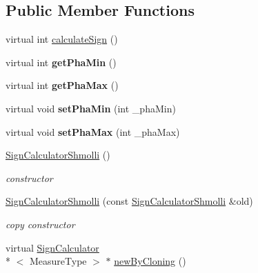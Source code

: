 \subsection*{Public Member Functions}
\begin{DoxyCompactItemize}
\item 
virtual int \hyperlink{class_ox_1_1_sign_calculator_shmolli_ab981a3a9790976de560609860f455edd}{calculate\-Sign} ()
\item 
\hypertarget{class_ox_1_1_sign_calculator_shmolli_af1182129716f5b952023280e61838a52}{virtual int {\bfseries get\-Pha\-Min} ()}\label{class_ox_1_1_sign_calculator_shmolli_af1182129716f5b952023280e61838a52}

\item 
\hypertarget{class_ox_1_1_sign_calculator_shmolli_afa6d41a49c0a321100164ae203904496}{virtual int {\bfseries get\-Pha\-Max} ()}\label{class_ox_1_1_sign_calculator_shmolli_afa6d41a49c0a321100164ae203904496}

\item 
\hypertarget{class_ox_1_1_sign_calculator_shmolli_aacfc207842127c87086f5595b9188acd}{virtual void {\bfseries set\-Pha\-Min} (int \-\_\-pha\-Min)}\label{class_ox_1_1_sign_calculator_shmolli_aacfc207842127c87086f5595b9188acd}

\item 
\hypertarget{class_ox_1_1_sign_calculator_shmolli_a3ec4977cf59bff37f95aa3fb1da1ae24}{virtual void {\bfseries set\-Pha\-Max} (int \-\_\-pha\-Max)}\label{class_ox_1_1_sign_calculator_shmolli_a3ec4977cf59bff37f95aa3fb1da1ae24}

\item 
\hypertarget{class_ox_1_1_sign_calculator_shmolli_a6ecfab9fb03fec0e62ad4951d5ab6c1b}{\hyperlink{class_ox_1_1_sign_calculator_shmolli_a6ecfab9fb03fec0e62ad4951d5ab6c1b}{Sign\-Calculator\-Shmolli} ()}\label{class_ox_1_1_sign_calculator_shmolli_a6ecfab9fb03fec0e62ad4951d5ab6c1b}

\begin{DoxyCompactList}\small\item\em constructor \end{DoxyCompactList}\item 
\hypertarget{class_ox_1_1_sign_calculator_shmolli_ae5b6751ae99992cc2075f0dc4b729605}{\hyperlink{class_ox_1_1_sign_calculator_shmolli_ae5b6751ae99992cc2075f0dc4b729605}{Sign\-Calculator\-Shmolli} (const \hyperlink{class_ox_1_1_sign_calculator_shmolli}{Sign\-Calculator\-Shmolli} \&old)}\label{class_ox_1_1_sign_calculator_shmolli_ae5b6751ae99992cc2075f0dc4b729605}

\begin{DoxyCompactList}\small\item\em copy constructor \end{DoxyCompactList}\item 
virtual \hyperlink{class_ox_1_1_sign_calculator}{Sign\-Calculator}\\*
$<$ Measure\-Type $>$ $\ast$ \hyperlink{class_ox_1_1_sign_calculator_shmolli_a9d9cd9b7107e43b4762846f54ff023d4}{new\-By\-Cloning} ()
\end{DoxyCompactItemize}
